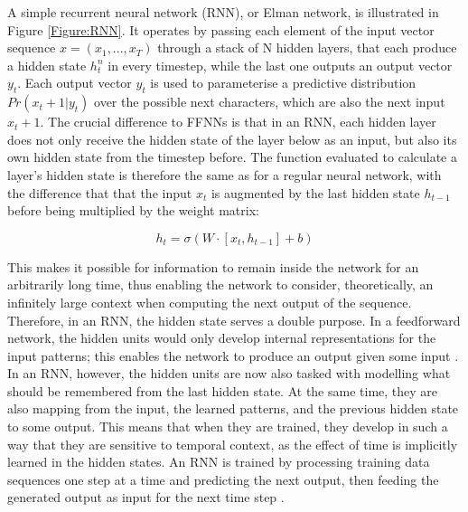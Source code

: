 \documentclass[11pt,a4paper,twoside,openright]{scrbook}
\begin{document}
A simple recurrent neural network (RNN), or Elman network, is illustrated in Figure \ref{Figure:RNN}. It operates by passing each element of the input vector sequence $x = (x_1, ..., x_T)$ through a stack of N hidden layers, that each produce a hidden state $h^n_t$ in every timestep, while the last one outputs an output vector $y_t$. Each output vector $y_t$ is used to parameterise a predictive distribution $Pr(x_t+1|y_t)$ over the possible next characters, which are also the next input $x_t+1$. The crucial difference to FFNNs is that in an RNN, each hidden layer does not only receive the hidden state of the layer below as an input, but also its own hidden state from the timestep before. The function evaluated to calculate a layer’s hidden state is therefore the same as for a regular neural network, with the difference that that the input $x_t$ is augmented by the last hidden state $h_{t-1}$ before being multiplied by the weight matrix:
	
\begin{equation}
h_t = \sigma (W \cdot [x_t, h_{t-1}] + b)
\end{equation} 

This makes it possible for information to remain inside the network for an arbitrarily long time, thus enabling the network to consider, theoretically, an infinitely large context when computing the next output of the sequence. 
Therefore, in an RNN, the hidden state serves a double purpose. In a feedforward network, the hidden units would only develop internal representations for the input patterns; this enables the network to produce an output given some input \cite{elman}.  In an RNN, however, the hidden units are now also tasked with modelling what should be remembered from the last hidden state. At the same time, they are also mapping from the input, the learned patterns, and the previous hidden state to some output. This means that when they are trained, they develop in such a way that they are sensitive to temporal context, as the effect of time is implicitly learned in the hidden states.
An RNN is trained by processing training data sequences one step at a time and predicting the next output, then feeding the generated output as input for the next time step \cite{graves}.
\end{document}
